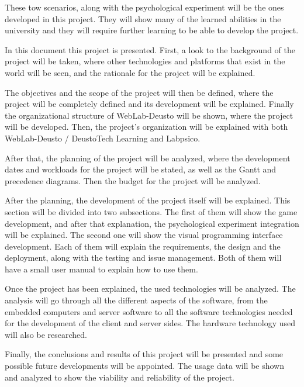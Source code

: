 These tow scenarios, along with the psychological experiment will be the ones developed in this
project. They will show many of the learned abilities in the university and they will require
further learning to be able to develop the project.

In this document this project is presented. First, a look to the background of the project will be
taken, where other technologies and platforms that exist in the world will be seen, and the
rationale for the project will be explained.

The objectives and the scope of the project will then be defined, where the project will be
completely defined and its development will be explained. Finally the organizational structure of
WebLab-Deusto will be shown, where the project will be developed. Then, the project's organization
will be explained with both WebLab-Deusto / DeustoTech Learning and Labpsico.

After that, the planning of the project will be analyzed, where the development dates and workloads
for the project will be stated, as well as the Gantt and precedence diagrams. Then the budget for
the project will be analyzed.

After the planning, the development of the project itself will be explained. This section will be
divided into two subsections. The first of them will show the game development, and after that
explanation, the psychological experiment integration will be explained. The second one will show
the visual programming interface development. Each of them will explain the requirements, the design
and the deployment, along with the testing and issue management. Both of them will have a small user
manual to explain how to use them.

Once the project has been explained, the used technologies will be analyzed. The analysis will go
through all the different aspects of the software, from the embedded computers and server software
to all the software technologies needed for the development of the client and server sides. The
hardware technology used will also be researched.

Finally, the conclusions and results of this project will be presented and some possible future
developments will be appointed. The usage data will be shown and analyzed to show the viability and
reliability of the project.
